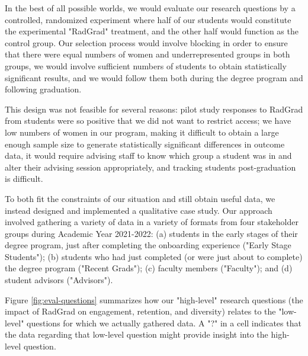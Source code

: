 \documentclass[acmsmall]{acmart}
\begin{document}
In the best of all possible worlds, we would evaluate our research questions by a controlled, randomized experiment where half of our students would constitute the experimental "RadGrad" treatment, and the other half would function as the control group.  Our selection process would involve blocking in order to ensure that there were equal numbers of women and underrepresented groups in both groups, we would involve sufficient numbers of students to obtain statistically significant results, and we would follow them both during the degree program and following graduation.

This design was not feasible for several reasons: pilot study responses to RadGrad from students were so positive that we did not want to restrict access; we have low numbers of women in our program, making it difficult to obtain a large enough sample size to generate statistically significant differences in outcome data, it would require advising staff to know which group a student was in and alter their advising session appropriately, and tracking students post-graduation is difficult.

To both fit the constraints of our situation and still obtain useful data, we instead designed and implemented a qualitative case study. Our approach involved gathering a variety of data in a variety of formats from four stakeholder groups during Academic Year 2021-2022: (a) students in the early stages of their degree program, just after completing the onboarding experience ("Early Stage Students"); (b) students who had just completed (or were just about to complete) the degree program ("Recent Grads"); (c) faculty members ("Faculty"); and (d) student advisors ("Advisors").

Figure \ref{fig:eval-questions} summarizes how our "high-level" research questions (the impact of RadGrad on engagement, retention, and diversity) relates to the "low-level" questions for which we actually gathered data. A "?" in a cell indicates that the data regarding that low-level question might provide insight into the high-level question.
\end{document}
